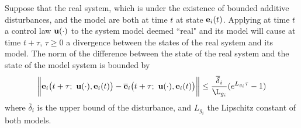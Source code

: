 \begin{bw_box}
  \begin{lemma}
    Suppose that the real system, which is under the existence of bounded
    additive disturbances, and the model are both at time $t$ at state
    $\bm{\mathbf{e}}_i(t)$. Applying at time $t$ a control law $\bm{\mathbf{u}}(\cdot)$
    to the system model deemed ``real" and its model will cause at time $t + \tau$,
    $\tau \geq 0$ a divergence between the states of the real system and its
    model. The norm of the difference between the state of the real system
    and the state of the model system is bounded by
    \begin{align}
      \bigg\| \vect{e}_i\big(t + \tau;\ \vect{u}(\cdot), \vect{e}_i(t)\big) -
        \overline{\vect{e}}_i\big(t + \tau;\ \vect{u}(\cdot), \vect{e}_i(t)\big) \bigg\|
        \leq \dfrac{\overline{\delta}_i}{\L_{g_i}} (e^{L_{g_i} \tau} - 1)
    \end{align}
    where $\overline{\delta}_i$ is the upper bound of the disturbance,
    and $L_{g_i}$ the Lipschitz constant of both models.
    \label{lemma:diff_state_from_same_conditions}
  \end{lemma}
\end{bw_box}

